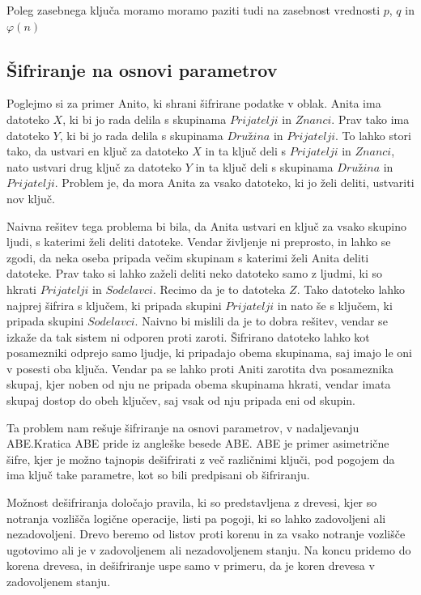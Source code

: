 \documentclass[12pt,a4paper,openany]{book}
\begin{document}
Poleg zasebnega ključa moramo moramo paziti tudi na zasebnost vrednosti $p$, $q$ in $\varphi(n)$



\subsection{Šifriranje na osnovi parametrov}

Poglejmo si za primer Anito, ki shrani šifrirane podatke v oblak. Anita ima datoteko $X$, ki bi jo rada delila s skupinama $Prijatelji$ in $Znanci$. Prav tako ima datoteko $Y$, ki bi jo rada delila s skupinama $Družina$ in $Prijatelji$. To lahko stori tako, da ustvari en ključ za datoteko $X$ in ta ključ deli s $Prijatelji$ in $Znanci$, nato ustvari drug ključ za datoteko $Y$ in ta ključ deli s skupinama $Družina$ in $Prijatelji$. Problem je, da mora Anita za vsako datoteko, ki jo želi deliti, ustvariti nov ključ.

Naivna rešitev tega problema bi bila, da Anita ustvari en ključ za vsako skupino ljudi, s katerimi želi deliti datoteke. Vendar življenje ni preprosto, in lahko se zgodi, da neka oseba pripada večim skupinam s katerimi želi Anita deliti datoteke. Prav tako si lahko zaželi deliti neko datoteko samo z ljudmi, ki so hkrati $Prijatelji$ in $Sodelavci$. Recimo da je to datoteka $Z$. Tako datoteko lahko najprej šifrira s ključem, ki pripada skupini $Prijatelji$ in nato še s ključem, ki pripada skupini $Sodelavci$. Naivno bi mislili da je to dobra rešitev, vendar se izkaže da tak sistem ni odporen proti zaroti. Šifrirano datoteko lahko kot posamezniki odprejo samo ljudje, ki pripadajo obema skupinama, saj imajo le oni v posesti oba ključa. Vendar pa se lahko proti Aniti zarotita dva posameznika skupaj, kjer noben od nju ne pripada obema skupinama hkrati, vendar imata skupaj dostop do obeh ključev, saj vsak od nju pripada eni od skupin.

Ta problem nam rešuje šifriranje na osnovi parametrov, v nadaljevanju ABE.\@ Kratica ABE pride iz angleške besede \gls{ABE}. ABE je primer asimetrične šifre, kjer je možno tajnopis dešifrirati z več različnimi ključi, pod pogojem da ima ključ take parametre, kot so bili predpisani ob šifriranju.

Možnost dešifriranja določajo pravila, ki so predstavljena z drevesi, kjer so notranja vozlišča logične operacije, listi pa pogoji, ki so lahko zadovoljeni ali nezadovoljeni. Drevo beremo od listov proti korenu in za vsako notranje vozlišče ugotovimo ali je v zadovoljenem ali nezadovoljenem stanju. Na koncu pridemo do korena drevesa, in dešifriranje uspe samo v primeru, da je koren drevesa v zadovoljenem stanju.
\end{document}
